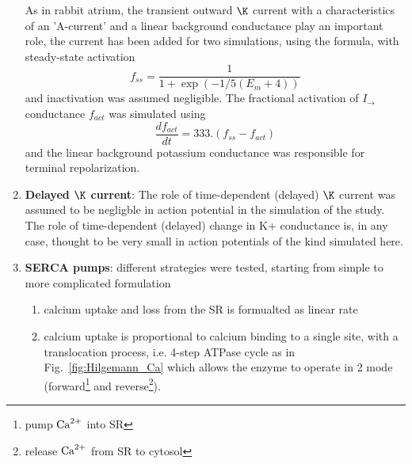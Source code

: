 \begin{enumerate}
  As in rabbit atrium, the transient outward $\K$ current with a
  characteristics of an 'A-current' and a linear background conductance play an
  important role, the current has been added for two simulations, using the
  formula, with steady-state activation
  \begin{equation}
  \label{eq:hilgemann1987_34}
  f_{ss} = \frac{1}{1+\exp\left( -1/5(E_m+4) \right)}
  \end{equation}
  and inactivation was assumed negligible. The fractional activation of $I_\to$
  conductance $f_{act}$ was simulated using
  \begin{equation}
  \label{eq:hilgemann1987_35}
  \frac{df_{act}}{dt} = 333.(f_{ss}-f_{act})
  \end{equation}
  and the linear background potassium conductance was responsible for terminal
  repolarization. 


\item {\bf Delayed $\K$ current}: The role of time-dependent (delayed) $\K$
current was assumed to be negligble in action potential in the simulation of the
study. The role of time-dependent (delayed) change in K+ conductance is, in any
case, thought to be very small in action potentials of the kind simulated here.

 
  \item {\bf SERCA pumps}: different strategies were tested, starting from
  simple to more complicated formulation
  \begin{enumerate}
    \item calcium uptake and loss from the SR is formualted as linear rate
    \citep{difrancesco1985mcea}
    \item calcium uptake is proportional to calcium binding to a single site,
    with a translocation process, i.e. 4-step ATPase cycle as  in
    Fig.~\ref{fig:Hilgemann_Ca} which allows the enzyme to operate in  2 mode
    (forward\footnote{pump ${\text{Ca}^{2+}}$ into SR} and reverse\footnote{release ${\text{Ca}^{2+}}$
    from SR to cytosol}). 
    

\end{enumerate}
\end{enumerate}
